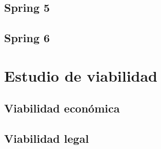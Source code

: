 \subsection{Spring 5}

\subsection{Spring 6}


\section{Estudio de viabilidad}

\subsection{Viabilidad económica}

\subsection{Viabilidad legal}


